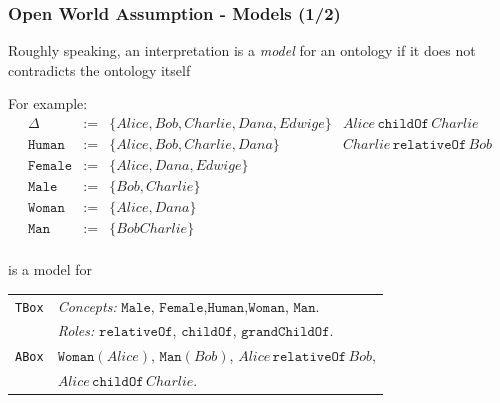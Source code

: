 \documentclass[8pt]{beamer}
\newcommand{\TBox}{{\tt TBox}}
\newcommand{\ABox}{{\tt ABox}}
\newcommand{\Human}{\mathtt{Human}}
\newcommand{\Male}{\mathtt{Male}}
\newcommand{\Female}{\mathtt{Female}}
\newcommand{\Man}{\mathtt{Man}}
\newcommand{\Woman}{\mathtt{Woman}}
\newcommand{\relative}{\mathtt{relativeOf}}
\newcommand{\child}{\mathtt{childOf}}
\newcommand{\grandchild}{\mathtt{grandChildOf}}
\newcommand{\Alice}{Alice}
\newcommand{\Bob}{Bob}
\newcommand{\Charlie}{Charlie}
\newcommand{\Dana}{Dana}
\newcommand{\Edwige}{Edwige}
\begin{document}
\begin{frame}
\frametitle{Open World Assumption - Models (1/2)}
Roughly speaking, an interpretation is a \emph{model} for an ontology
if it does not contradicts the ontology itself
\vspace{\baselineskip}

For example:
\[
 \begin{array}{rcl|l}
 \Delta & := & \{ \Alice, \Bob, \Charlie, \Dana, \Edwige\} & \Alice\,\child\,\Charlie\\
 \Human & := & \{ \Alice, \Bob, \Charlie, \Dana \} & \Charlie\,\relative\,\Bob\\
 \Female & := & \{ \Alice, \Dana, \Edwige \} \\
 \Male & := & \{\Bob, \Charlie \}\\
 \Woman & := & \{ \Alice, \Dana \} \\
 \Man & := & \{\Bob \Charlie \} \\
 \end{array}
\]

is a model for

\begin{center}
  \begin{tabular}{|l|l|}
    \hline
    \TBox & \emph{Concepts:} $\Male$, $\Female$,$\Human$,$\Woman$, $\Man$. \\ 
    & \emph{Roles:} $\relative$, $\child$, $\grandchild$. \\      
    \hline
    \ABox & $\Woman(\Alice)$, $\Man(\Bob)$, $\Alice\,\relative\,\Bob$, \\
     & $\Alice\,\child\,\Charlie$. \\
    \hline
  \end{tabular}
\end{center}
\end{frame}
\end{document}

